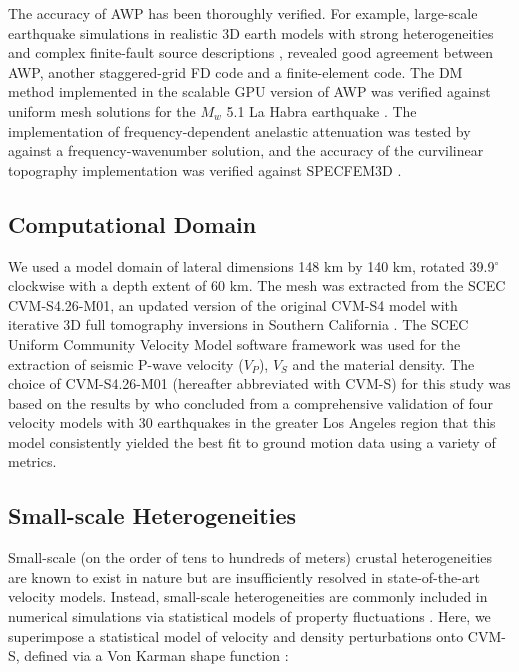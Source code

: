 The accuracy of AWP has been thoroughly verified. For example, large-scale earthquake simulations in realistic 3D earth models with strong heterogeneities and complex finite-fault source descriptions \citep{bielakShakeOutEarthquakeScenario2010,bielak2016verification}, revealed good agreement between AWP, another staggered-grid FD code and a finite-element code. The DM method implemented in the scalable GPU version of AWP was verified against uniform mesh solutions for the $M_w$ 5.1 La Habra earthquake \citep{rotenHighfrequencyNonlinearEarthquake2018}. The implementation of frequency-dependent anelastic attenuation was tested by \citet{withersMemoryEfficientSimulation2015} against a frequency-wavenumber solution, and the accuracy of the curvilinear topography implementation \citet{oreillyHighorderFiniteDifference2021} was verified against SPECFEM3D \citep{komatitschSpectralelementSimulationsGlobal2002}.


\subsection{Computational Domain}
We used a model domain of lateral dimensions 148 km by 140 km, rotated 39.9$^{\circ}$ clockwise with a depth extent of 60 km. The mesh was extracted from the SCEC CVM-S4.26-M01, an updated version of the original CVM-S4 model \citep{magistraleSCECSouthernCalifornia2000,kohlerMantleHeterogeneitiesSCEC2003} with iterative 3D full tomography inversions in Southern California \citep{leeRapidFullwaveCentroid2011}. The SCEC Uniform Community Velocity Model software framework \citep[V19.4][]{smallSCECUnifiedCommunity2017} was used for the extraction of seismic P-wave velocity ($V_P$), $V_S$ and the material density. The choice of CVM-S4.26-M01 (hereafter abbreviated with CVM-S) for this study was based on the results by \citet{tabordaEvaluationSouthernCalifornia2016} who concluded from a comprehensive validation of four velocity models with 30 earthquakes in the greater Los Angeles region that this model consistently yielded the best fit to ground motion data using a variety of metrics.

\subsection{Small-scale Heterogeneities}
Small-scale (on the order of tens to hundreds of meters) crustal heterogeneities are known to exist in nature but are insufficiently resolved in state-of-the-art velocity models. Instead, small-scale heterogeneities are commonly included in numerical simulations via statistical models of property fluctuations . Here, we superimpose a statistical model of velocity and density perturbations onto CVM-S, defined via a Von Karman shape function \citep{frankelFiniteDifferenceSimulations1986}:

